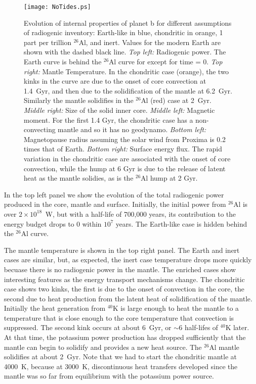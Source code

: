 \documentclass[preprint,12pt]{aastex}
\begin{document}
\begin{figure} 
\begin{center}
\texttt{[image: NoTides.ps]}
\end{center}
\caption{Evolution of internal properties of planet b for different
  assumptions of radiogenic inventory: Earth-like in blue, chondritic
  in orange, 1 part per trillion $^{26}$Al, and inert. Values for the
  modern Earth are shown with the dashed black line. {\it Top left:}
  Radiogenic power. The Earth curve is behind the $^{26}$Al curve for
  except for time = 0. {\it Top right:} Mantle Temperature. In the
  chondritic case (orange), the two kinks in the curve are due to the
  onset of core convection at 1.4~Gyr, and then due to the
  solidification of the mantle at 6.2~Gyr. Similarly the mantle
  solidifies in the $^{26}$Al (red) case at 2~Gyr. {\it Middle right:}
  Size of the solid inner core. {\it Middle left:} Magnetic
  moment. For the first 1.4 Gyr, the chondritic case has a
  non-convecting mantle and so it has no geodynamo. {\it Bottom left:}
  Magnetopause radius assuming the solar wind from Proxima is 0.2
  times that of Earth. {\it Bottom right:} Surface energy flux. The
  rapid variation in the chondritic case are associated with the onset
  of core convection, while the hump at 6 Gyr is due to the release of
  latent heat as the mantle solidies, as is the $^{26}$Al hump at 2
  Gyr.}
\label{fig:radiog}
\end{figure}

In the top left panel we show the evolution of the total radiogenic
power produced in the core, mantle and surface. Initially, the initial
power from $^{26}$Al is over $2 \times 10^{18}$~W, but with a
half-life of 700,000 years, its contribution to the energy budget
drops to 0 within $10^7$ years. The Earth-like case is hidden behind
the $^{26}$Al curve.

The mantle temperature is shown in the top right panel. The Earth and
inert cases are similar, but, as expected, the inert case temperature
drops more quickly becuase there is no radiogenic power in the
mantle. The enriched cases show interesting features as the energy
transport mechanisms change. The chondritic case shows two kinks, the
first is due to the onset of convection in the core, the second due to
heat production from the latent heat of solidification of the
mantle. Initially the heat generation from $^{40}$K is large enough to
heat the mantle to a temperature that is close enough to the core
temperature that convection is suppressed. The second kink occurs at
about 6~Gyr, or $\sim$6 half-lifes of $^{40}$K later. At that time, the
potassium power production has dropped sufficiently that the mantle
can begin to solidify and provides a new heat source. The $^{26}$Al
mantle solidifies at about 2~Gyr. Note that we had to start the
chondritic mantle at 4000~K, because at 3000~K, discontinuous heat
transfers developed since the mantle was so far from equilibrium
with the potassium power source.
\end{document}
